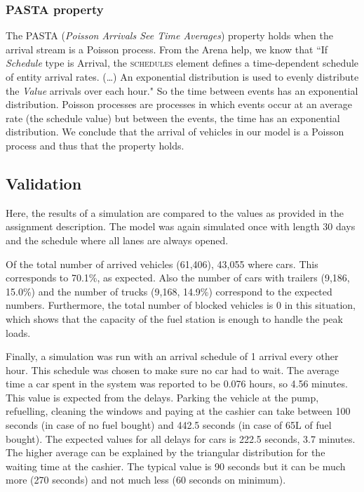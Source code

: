 \subsubsection{PASTA property}
The PASTA (\textit{Poisson Arrivals See Time Averages}) property holds when the arrival stream is a Poisson process.
From the Arena help, we know that ``If \textit{Schedule} type is Arrival, the \textsc{schedules} element defines a time-dependent schedule of entity arrival rates. (\ldots)
An exponential distribution is used to evenly distribute the \textit{Value} arrivals over each hour."
So the time between events has an exponential distribution.
Poisson processes are processes in which events occur at an average rate (the schedule value) but between the events, the time has an exponential distribution.
We conclude that the arrival of vehicles in our model is a Poisson process and thus that the property holds.

\subsection{Validation}
Here, the results of a simulation are compared to the values as provided in the assignment description.
The model was again simulated once with length 30 days and the schedule where all lanes are always opened.

Of the total number of arrived vehicles (61,406), 43,055 where cars. 
This corresponds to 70.1\%, as expected.
Also the number of cars with trailers (9,186, 15.0\%) and the number of trucks (9,168, 14.9\%) correspond to the expected numbers.
Furthermore, the total number of blocked vehicles is 0 in this situation, which shows that the capacity of the fuel station is enough to handle the peak loads.

Finally, a simulation was run with an arrival schedule of 1 arrival every other hour.
This schedule was chosen to make sure no car had to wait.
The average time a car spent in the system was reported to be 0.076 hours, so 4.56 minutes. 
This value is expected from the delays.
Parking the vehicle at the pump, refuelling, cleaning the windows and paying at the cashier can take between 100 seconds (in case of no fuel bought) and 442.5 seconds (in case of 65L of fuel bought). 
The expected values for all delays for cars is 222.5 seconds, 3.7 minutes.
The higher average can be explained by the triangular distribution for the waiting time at the cashier. 
The typical value is 90 seconds but it can be much more (270 seconds) and not much less (60 seconds on minimum). 




